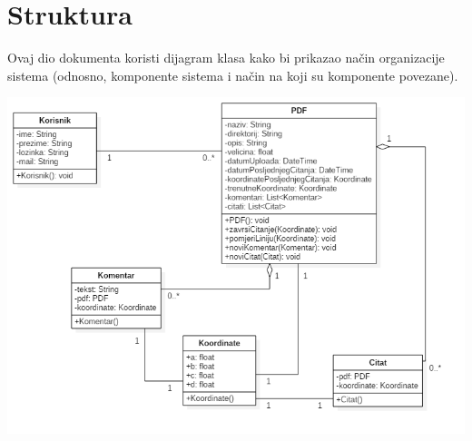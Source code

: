 \chapter{Struktura}

Ovaj dio dokumenta koristi dijagram klasa kako bi prikazao način organizacije sistema (odnosno, komponente sistema i način na koji su komponente povezane).

\begin{center}
    \includegraphics[scale=0.65]{images/DijagramKlasa.png}
\end{center}